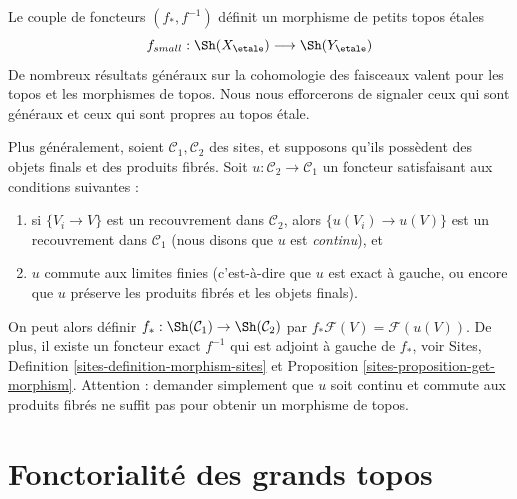 \noindent
Le couple de foncteurs $(f_*, f^{-1})$ d\'efinit un morphisme de petits topos \'etales
$$
f_{small} :
\Sh(X_\etale)
\longrightarrow
\Sh(Y_\etale)
$$
De nombreux r\'esultats g\'en\'eraux sur la cohomologie des faisceaux valent pour les topos et les
morphismes de topos. Nous nous efforcerons de signaler ceux qui sont
g\'en\'eraux et ceux qui sont propres au topos \'etale.

\begin{remark}
\label{remark-functoriality-general}
Plus g\'en\'eralement, soient $\mathcal{C}_1, \mathcal{C}_2$ des sites, et
supposons qu'ils poss\`edent des objets finals et des produits fibr\'es. Soit
$u: \mathcal{C}_2 \to \mathcal{C}_1$ un foncteur satisfaisant aux conditions suivantes :
\begin{enumerate}
\item si $\{V_i \to V\}$ est un recouvrement dans $\mathcal{C}_2$, alors
$\{u(V_i) \to u(V)\}$ est un recouvrement dans $\mathcal{C}_1$ (nous
disons que $u$ est {\it continu}), et
\item $u$ commute aux limites finies (c'est-\`a-dire que $u$ est exact \`a gauche, ou encore que
$u$ pr\'eserve les produits fibr\'es et les objets finals).
\end{enumerate}
On peut alors d\'efinir
$f_*: \Sh(\mathcal{C}_1) \to \Sh(\mathcal{C}_2)$
par $ f_* \mathcal{F}(V) = \mathcal{F}(u(V))$.
De plus, il existe un foncteur exact $f^{-1}$ qui
est adjoint \`a gauche de $f_*$, voir
Sites, Definition \ref{sites-definition-morphism-sites} et
Proposition \ref{sites-proposition-get-morphism}.
Attention : demander simplement que $u$ soit continu
et commute aux produits fibr\'es ne suffit pas pour obtenir un morphisme de topos.
\end{remark}




\section{Fonctorialit\'e des grands topos}
\label{section-functoriality-big-topoi}

